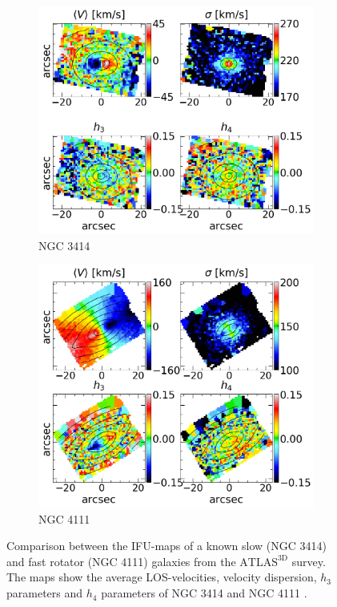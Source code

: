 \documentclass[english, oneside]{HYgradu}
\begin{document}
\begin{figure}
	\centering
	\begin{subfigure}[b]{0.49\textwidth}
		\includegraphics[width=\textwidth]{NGC3414_r6_voronoi.png}
		\caption{NGC 3414}
	\end{subfigure}
	\begin{subfigure}[b]{0.49\textwidth}
		\includegraphics[width=\textwidth]{NGC4111_r1_voronoi.png}
		\caption{NGC 4111}
	\end{subfigure}
	\caption{Comparison between the IFU-maps of a known slow (NGC 3414) and fast rotator (NGC 4111) galaxies from the $\mathrm{ATLAS^{3D}}$ survey. The maps show the average LOS-velocities, velocity dispersion, $h_3$ parameters and $h_4$ parameters of NGC 3414 \citep{Emsellem2004} and NGC 4111 \citep{Cappellari2011}.}
	\label{figure:obs_IFU}
\end{figure}
\end{document}
